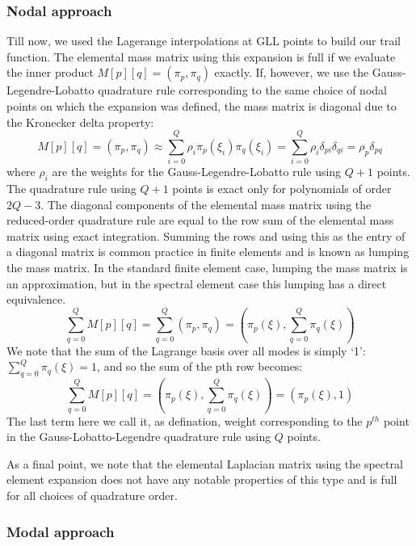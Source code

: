 \documentclass[
  a4paper,
  10pt]{article}
\begin{document}
\hypertarget{nodal-approach}{%
\subsubsection{Nodal approach}\label{nodal-approach}}

Till now, we used the Lagerange interpolations at GLL points to build
our trail function. The elemental mass matrix using this expansion is
full if we evaluate the inner product \(M[p][q] = (\pi_p,\pi_q)\)
exactly. If, however, we use the Gauss-Legendre-Lobatto quadrature rule
corresponding to the same choice of nodal points on which the expansion
was defined, the mass matrix is diagonal due to the Kronecker delta
property: \begin{equation}
M[p][q] = (\pi_p,\pi_q) \approx\sum_{i=0}^{Q}\rho_i\pi_p(\xi_i)\pi_q(\xi_i) = \sum_{i=0}^{Q}\rho_i\delta_{pi}\delta_{qi} = \rho_p\delta_{pq}
\end{equation} where \(\rho_i\) are the weights for the
Gauss-Legendre-Lobatto rule using \(Q+1\) points. The quadrature rule
using \(Q + 1\) points is exact only for polynomials of order \(2Q-3\).
The diagonal components of the elemental mass matrix using the
reduced-order quadrature rule are equal to the row sum of the elemental
mass matrix using exact integration. Summing the rows and using this as
the entry of a diagonal matrix is common practice in finite elements and
is known as lumping the mass matrix. In the standard finite element
case, lumping the mass matrix is an approximation, but in the spectral
element case this lumping has a direct equivalence. \begin{equation}
\sum_{q=0}^Q M[p][q] = \sum_{q=0}^Q(\pi_p,\pi_q) =(\pi_p(\xi),\sum_{q=0}^Q\pi_q(\xi))
\end{equation} We note that the sum of the Lagrange basis over all modes
is simply `1': \(\sum_{q=0}^Q\pi_q(\xi)=1\), and so the sum of the pth
row becomes: \begin{equation}
\sum_{q=0}^Q M[p][q]  =(\pi_p(\xi),\sum_{q=0}^Q\pi_q(\xi))= (\pi_p(\xi),1)
\end{equation} The last term here we call it, as defination, weight
corresponding to the \(p^{th}\) point in the Gauss-Lobatto-Legendre
quadrature rule using \(Q\) points.

As a final point, we note that the elemental Laplacian matrix using the
spectral element expansion does not have any notable properties of this
type and is full for all choices of quadrature order.

\hypertarget{modal-approach}{%
\subsubsection{Modal approach}\label{modal-approach}}
\end{document}
